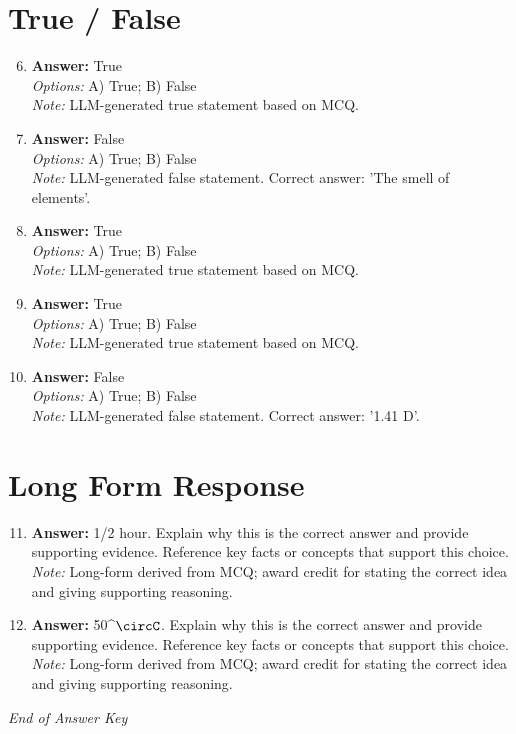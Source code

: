 \documentclass[12pt]{article}
\begin{document}
\section*{True / False}
\begin{enumerate}[label=\arabic*.]
\setcounter{enumi}{5}
\item \textbf{Answer:} True
\\ \textit{Options:} A) True; B) False
\\ \textit{Note:} LLM-generated true statement based on MCQ.
\item \textbf{Answer:} False
\\ \textit{Options:} A) True; B) False
\\ \textit{Note:} LLM-generated false statement. Correct answer: 'The smell of elements'.
\item \textbf{Answer:} True
\\ \textit{Options:} A) True; B) False
\\ \textit{Note:} LLM-generated true statement based on MCQ.
\item \textbf{Answer:} True
\\ \textit{Options:} A) True; B) False
\\ \textit{Note:} LLM-generated true statement based on MCQ.
\item \textbf{Answer:} False
\\ \textit{Options:} A) True; B) False
\\ \textit{Note:} LLM-generated false statement. Correct answer: '1.41 $\mathrm{D}$'.
\end{enumerate}

\section*{Long Form Response}
\begin{enumerate}[label=\arabic*.]
\setcounter{enumi}{10}
\item \textbf{Answer:} 1/2 hour. Explain why this is the correct answer and provide supporting evidence. Reference key facts or concepts that support this choice.
\\ \textit{Note:} Long-form derived from MCQ; award credit for stating the correct idea and giving supporting reasoning.
\item \textbf{Answer:} 50^\ensuremath{\circC}. Explain why this is the correct answer and provide supporting evidence. Reference key facts or concepts that support this choice.
\\ \textit{Note:} Long-form derived from MCQ; award credit for stating the correct idea and giving supporting reasoning.
\end{enumerate}

\vfill
\noindent\textit{End of Answer Key}
\end{document}
